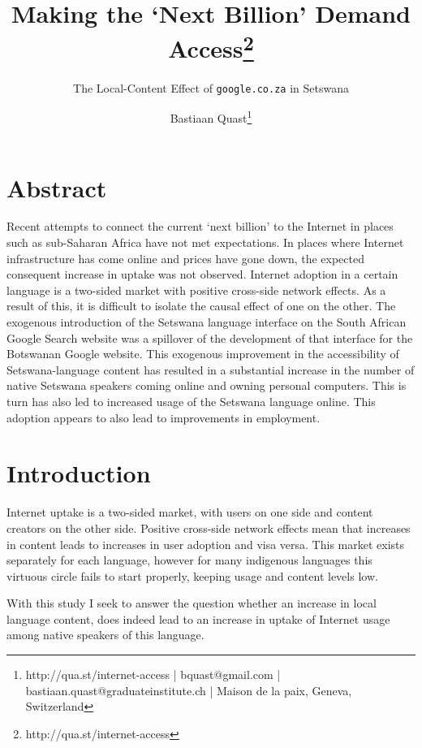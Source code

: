\documentclass[a4paper,british]{article}\usepackage[]{graphicx}\usepackage[]{color}
\newcommand{\code}[1]{\texttt{#1}}
\begin{document}
\title{Making the `Next Billion' Demand Access\thanks{http://qua.st/internet-access}}

\author{The Local-Content Effect of \code{google.co.za} in Setswana}

\date{Bastiaan Quast\thanks{http://qua.st/internet-access | bquast@gmail.com | bastiaan.quast@graduateinstitute.ch
| Maison de la paix, Geneva, Switzerland}}
\maketitle

\section*{Abstract}

Recent attempts to connect the current `next billion' to the Internet
in places such as sub-Saharan Africa have not met expectations. In
places where Internet infrastructure has come online and prices have
gone down, the expected consequent increase in uptake was not observed.
Internet adoption in a certain language is a two-sided market with
positive cross-side network effects. As a result of this, it is difficult
to isolate the causal effect of one on the other. The exogenous introduction
of the Setswana language interface on the South African Google Search
website was a spillover of the development of that interface for the
Botswanan Google website. This exogenous improvement in the accessibility
of Setswana-language content has resulted in a substantial increase
in the number of native Setswana speakers coming online and owning
personal computers. This is turn has also led to increased usage of
the Setswana language online. This adoption appears to also lead to
improvements in employment.

\section{Introduction}

\label{sec:intro-1}Internet uptake is a two-sided market, with users
on one side and content creators on the other side. Positive cross-side
network effects mean that increases in content leads to increases
in user adoption and visa versa. This market exists separately for
each language, however for many indigenous languages this virtuous
circle fails to start properly, keeping usage and content levels low. 

With this study I seek to answer the question whether an increase
in local language content, does indeed lead to an increase in uptake
of Internet usage among native speakers of this language.
\end{document}
